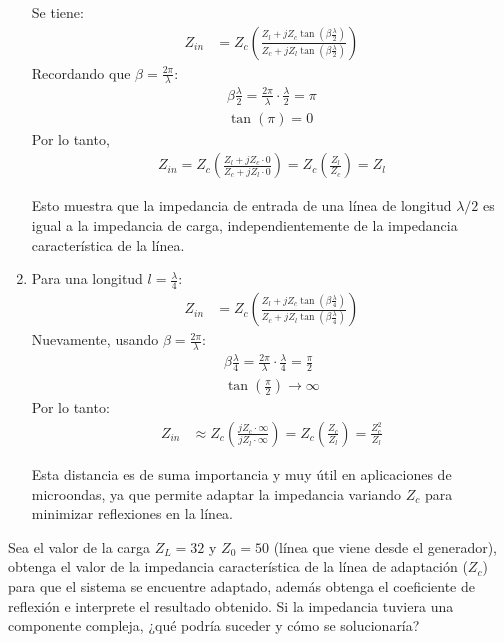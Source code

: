 \documentclass[
  11pt,
  letterpaper,
   addpoints,
   answers
  ]{exam}
\begin{document}
\begin{questions}
\begin{solution}
\begin{enumerate}
Se tiene:
\begin{align}
    Z_{in} &= Z_{c} \left( \frac{Z_{l} + jZ_{c} \tan\left(\beta \frac{\lambda}{2}\right)}{Z_{c} + jZ_{l} \tan\left(\beta \frac{\lambda}{2}\right)} \right)
\end{align}
Recordando que $\beta = \frac{2\pi}{\lambda}$:
\begin{align}
    \beta \frac{\lambda}{2} = \frac{2\pi}{\lambda} \cdot \frac{\lambda}{2} = \pi \\
    \tan(\pi) = 0
\end{align}
Por lo tanto,
\begin{align}
    Z_{in} = Z_{c} \left( \frac{Z_{l} + jZ_{c} \cdot 0}{Z_{c} + jZ_{l} \cdot 0} \right) = Z_{c} \left( \frac{Z_{l}}{Z_{c}} \right) = Z_{l}
\end{align}

Esto muestra que la impedancia de entrada de una línea de longitud $\lambda/2$ es igual a la impedancia de carga, independientemente de la impedancia característica de la línea.
\item Para una longitud $l = \frac{\lambda}{4}$:
\begin{align}
    Z_{in} &= Z_{c} \left( \frac{Z_{l} + jZ_{c} \tan\left( \beta \frac{\lambda}{4} \right) }{Z_{c} + jZ_{l} \tan\left( \beta \frac{\lambda}{4} \right)} \right)
\end{align}
Nuevamente, usando $\beta = \frac{2\pi}{\lambda}$:
\begin{align}
    \beta \frac{\lambda}{4} = \frac{2\pi}{\lambda} \cdot \frac{\lambda}{4} = \frac{\pi}{2} \\
    \tan\left( \frac{\pi}{2} \right) \to \infty
\end{align}
Por lo tanto:
\begin{align}
    Z_{in} &\approx Z_{c} \left( \frac{jZ_{c} \cdot \infty}{jZ_{l} \cdot \infty} \right) = Z_{c} \left( \frac{Z_{c}}{Z_{l}} \right) = \frac{Z_{c}^2}{Z_{l}}
\end{align}

Esta distancia es de suma importancia y muy útil en aplicaciones de microondas, ya que permite adaptar la impedancia variando $Z_{c}$ para minimizar reflexiones en la línea.

        \end{enumerate}
    \end{solution}
    \question 
    Sea el valor de la carga $Z_L = 32$ y $Z_0 = 50$ (línea que viene desde el generador), obtenga el valor de la impedancia característica de la línea de adaptación ($Z_c$) para que el sistema se encuentre adaptado, además obtenga el coeficiente de reflexión e interprete el resultado obtenido. Si la impedancia tuviera una componente compleja, ¿qué podría suceder y cómo se solucionaría?


\end{questions}
\end{document}
